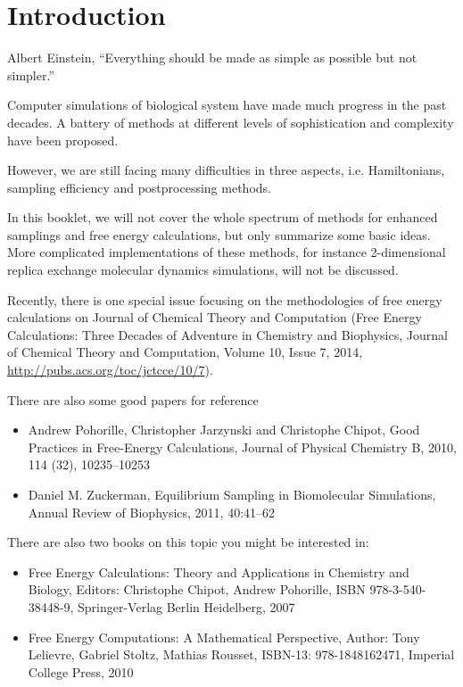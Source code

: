 \chapter{Introduction\label{chapter:introduction}}

\begin{chapquote}{Albert Einstein, %
	}
``Everything should be made as simple as possible but not simpler.''
\end{chapquote}

Computer simulations of biological system have made much progress in the past decades. A battery of methods at different levels of sophistication and complexity have been proposed.

However, we are still facing many difficulties in three aspects, i.e. Hamiltonians, sampling efficiency and postprocessing methods.\cite{NielsJCTC2014}

In this booklet, we will not cover the whole spectrum of methods for enhanced samplings and free energy calculations, but only summarize some basic ideas. 
More complicated implementations of these methods, for instance 2-dimensional replica exchange molecular dynamics simulations, will not be discussed.

Recently, there is one special issue focusing on the methodologies of free energy calculations on Journal of Chemical Theory and Computation (Free Energy Calculations: Three Decades of Adventure in Chemistry and Biophysics, Journal of Chemical Theory and Computation, Volume 10, Issue 7, 2014, \url{http://pubs.acs.org/toc/jctcce/10/7}). 

There are also some good papers for reference
\begin{itemize}
	\item Andrew Pohorille, Christopher Jarzynski and Christophe Chipot, Good Practices in Free-Energy Calculations, Journal of Physical Chemistry B, 2010, 114 (32), 10235–10253
	\item Daniel M. Zuckerman, Equilibrium Sampling in Biomolecular Simulations, Annual Review of Biophysics, 2011, 40:41–62
\end{itemize}


There are also two books on this topic you might be interested in:
\begin{itemize}
\item Free Energy Calculations: Theory and Applications in Chemistry and Biology, Editors: Christophe Chipot, Andrew Pohorille, ISBN 978-3-540-38448-9, Springer-Verlag Berlin Heidelberg, 2007
\item Free Energy Computations: A Mathematical Perspective, Author: Tony Lelievre, Gabriel Stoltz, Mathias Rousset, ISBN-13: 978-1848162471, Imperial College Press, 2010
\end{itemize}

